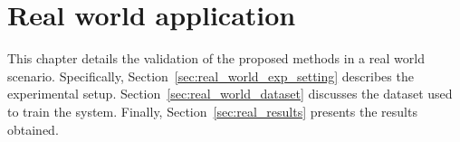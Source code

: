 \chapter{Real world application}
\label{ch:real_world_application}
This chapter details the validation of the proposed methods in a real world scenario. Specifically, Section~\ref{sec:real_world_exp_setting} describes the experimental setup. Section~\ref{sec:real_world_dataset} discusses the dataset used to train the system. Finally, Section~\ref{sec:real_results} presents the results obtained.





